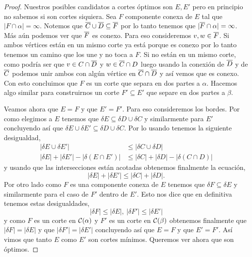 \documentclass[tesis.tex]{subfiles}
\begin{document}
\begin{proof}
	Nuestros posibles candidatos a cortes óptimos son $E,E'$ pero en principio no sabemos si son cortes siquiera.
	Sea $F$ componente conexa de $E$ tal que $|F \cap \alpha| = \infty$.
	Notemos que $\overline C \cup \overline D \subseteq \overline F$ por lo tanto tenemos que $|\overline F \cap \alpha|=\infty$.
	Más aún podemos ver que $\overline F$ es conexo.
	Para eso consideremos $v,w \in \overline F$.
	Si ambos vértices están en un mismo corte ya está porque es conexo por lo tanto tenemos un camino que los une y no toca a $F$.
	Si no están en un mismo corte, como podría ser que $v \in C \cap \overline D$ y $w \in \overline C \cap D$ luego usando la conexión de $\overline D$ y de $\overline C$ podemos unir ambos con algún vértice en $\overline C \cap \overline D$ y así vemos que es conexo.
	Con esto concluimos que $F$ es un corte que separa en dos partes a $\alpha$.
	Hacemos algo similar para construirnos un corte $F' \subseteq E'$ que separe en dos partes a $\beta$.
	
	Veamos ahora que $E=F$ y que $E' = F'$.
	Para eso consideremos los bordes. 
	Por como elegimos a $E$ tenemos que $\delta E \subseteq \delta D \cup \delta C$ y similarmente para $E'$ concluyendo así que $\delta E \cup \delta E' \subseteq \delta D \cup \delta C$.
	Por lo  usando tenemos la siguiente desigualdad,
	\begin{align*}
		|\delta E \cup \delta E'| & \le |\delta C \cup \delta D| \\
		|\delta E| + |\delta E'| - |\delta (E \cap E')| & \le |\delta C| + |\delta D| - |\delta (C \cap D)|
	\end{align*}
	y usando que las intersecciones están acotadas obtenemos finalmente la ecuación,
	\[
		|\delta E| + |\delta E'| \le |\delta C| + |\delta D|.
	\]
	Por otro lado como $F$ es una componente conexa de $E$ tenemos que $\delta F \subseteq \delta E$ y similarmente para el caso de $F'$ dentro de $E'$.
	Esto nos dice que en definitiva tenemos estas desigualdades,
	\[
		|\delta F| \le  |\delta E|, \ |\delta F'| \le |\delta E'| 
	\]
	y como $F$ es un corte en ${\cal C}(\alpha)$ y $F'$ es un corte en ${\cal C}(\beta)$ obtenemos finalmente que $|\delta F| = |\delta E|$ y que $|\delta F'| = |\delta E'|$ concluyendo así que $E=F$ y que $E'=F'$.
	Así vimos que tanto $E$ como $E'$ son cortes mínimos.
	Queremos ver ahora que son óptimos.
	

\end{proof}
\end{document}
